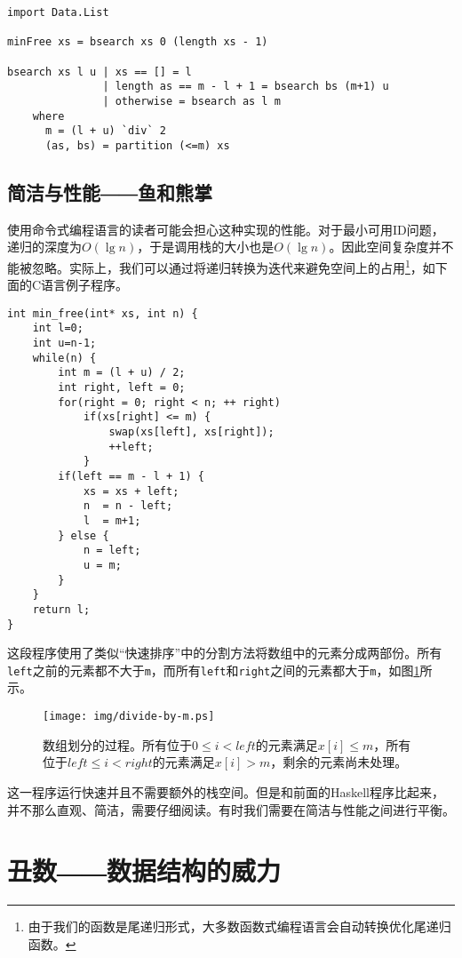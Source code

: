 \documentclass[UTF8]{article}
\begin{document}
\begin{lstlisting}[style=Haskell]
import Data.List

minFree xs = bsearch xs 0 (length xs - 1)

bsearch xs l u | xs == [] = l
               | length as == m - l + 1 = bsearch bs (m+1) u
               | otherwise = bsearch as l m
    where
      m = (l + u) `div` 2
      (as, bs) = partition (<=m) xs
\end{lstlisting}
\lstset{}

\subsection{简洁与性能――鱼和熊掌}
使用命令式编程语言的读者可能会担心这种实现的性能。对于最小可用ID问题，递归的深度为$O(\lg n)$，于是调用栈的大小也是$O(\lg n)$。因此空间复杂度并不能被忽略。实际上，我们可以通过将递归转换为迭代来避免空间上的占用\footnote{由于我们的函数是尾递归形式，大多数函数式编程语言会自动转换优化尾递归函数。}，如下面的C语言例子程序。

\lstset{language=C}
\begin{lstlisting}
int min_free(int* xs, int n) {
    int l=0;
    int u=n-1;
    while(n) {
        int m = (l + u) / 2;
        int right, left = 0;
        for(right = 0; right < n; ++ right)
            if(xs[right] <= m) {
                swap(xs[left], xs[right]);
                ++left;
            }
        if(left == m - l + 1) {
            xs = xs + left;
            n  = n - left;
            l  = m+1;
        } else {
            n = left;
            u = m;
        }
    }
    return l;
}
\end{lstlisting}

这段程序使用了类似“快速排序”中的分割方法将数组中的元素分成两部份。所有\texttt{left}之前的元素都不大于\texttt{m}，而所有\texttt{left}和\texttt{right}之间的元素都大于\texttt{m}，如图\ref{fig:divide}所示。

\begin{figure}[htbp]
  \centering
  \texttt{[image: img/divide-by-m.ps]}
  \caption{数组划分的过程。所有位于$0 \leq i < left$的元素满足$x[i] \leq m$，所有位于$left \leq i < right$的元素满足$x[i] > m$，剩余的元素尚未处理。} \label{fig:divide}
\end{figure}

这一程序运行快速并且不需要额外的栈空间。但是和前面的Haskell程序比起来，并不那么直观、简洁，需要仔细阅读。有时我们需要在简洁与性能之间进行平衡。

\section{丑数――数据结构的威力}
\end{document}
